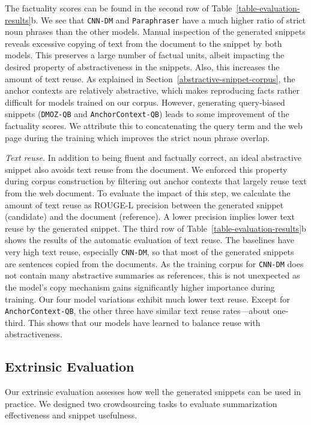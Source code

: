 \documentclass[sigconf]{acmart}
\newcommand{\bslabel}[1]{\textsl{#1.}}
\begin{document}
The factuality scores can be found in the second row of Table~\ref{table-evaluation-results}b. We see that {\small\tt CNN-DM} and {\small\tt Paraphraser} have a much higher ratio of strict noun phrases than the other models. Manual inspection of the generated snippets reveals excessive copying of text from the document to the snippet by both models. This preserves a large number of factual units, albeit impacting the desired property of abstractiveness in the snippets. Also, this increases the amount of text reuse. As explained in Section~\ref{abstractive-snippet-corpus}, the anchor contexts are relatively abstractive, which makes reproducing facts rather difficult for models trained on our corpus. However, generating query-biased snippets ({\small\tt DMOZ-QB} and {\small\tt AnchorContext-QB}) leads to some improvement of the factuality scores. We attribute this to concatenating the query term and the web page during the training which improves the strict noun phrase overlap. 

\bslabel{Text reuse}
In addition to being fluent and factually correct, an ideal abstractive snippet also avoids text reuse from the document. We enforced this property during corpus construction by filtering out anchor contexts that largely reuse text from the web document. To evaluate the impact of this step, we calculate the amount of text reuse as ROUGE-L precision between the generated snippet (candidate) and the document (reference). A lower precision implies lower text reuse by the generated snippet. The third row of Table~\ref{table-evaluation-results}b shows the results of the automatic evaluation of text reuse. The baselines have very high text reuse, especially {\small\tt CNN-DM}, so that most of the generated snippets are sentences copied from the documents. As the training corpus for {\small\tt CNN-DM} does not contain many abstractive summaries as references, this is not unexpected as the model's copy mechanism gains significantly higher importance during training. Our four model variations exhibit much lower text reuse. Except for {\small\tt AnchorContext-QB}, the other three have similar text reuse rates---about one-third. This shows that our models have learned to balance reuse with abstractiveness.

\subsection{Extrinsic Evaluation}

Our extrinsic evaluation assesses how well the generated snippets can be used in practice. We designed two crowdsourcing tasks to evaluate summarization effectiveness and snippet usefulness.
\end{document}
